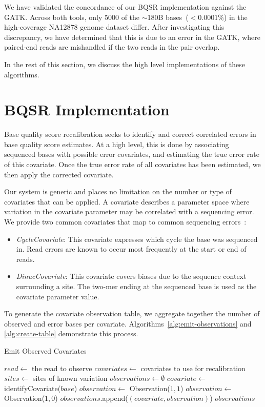 \documentclass[phd]{ucbthesis}
\begin{document}
\begin{enumerate}
We have validated the concordance of our BQSR implementation against the GATK. Across both tools, only 5000
of the $\sim$180B bases~($<0.0001\%$) in the high-coverage NA12878 genome dataset differ. After investigating
this discrepancy, we have determined that this is due to an error in the GATK, where paired-end reads are
mishandled if the two reads in the pair overlap.
\end{enumerate}

In the rest of this section, we discuss the high level implementations of these algorithms.

\section{BQSR Implementation}
\label{sec:bqsr-implementation}

Base quality score recalibration seeks to identify and correct correlated errors in base quality score estimates.
At a high level, this is done by associating sequenced bases with possible error covariates, and estimating the
true error rate of this covariate. Once the true error rate of all covariates has been estimated, we then apply
the corrected covariate.

Our system is generic and places no limitation on the number or type of covariates that can be applied. A covariate
describes a parameter space where variation in the covariate parameter may be correlated with a sequencing
error. We provide two common covariates that map to common sequencing errors~\cite{nakamura11}:

\begin{itemize}
\item \emph{CycleCovariate}: This covariate expresses which cycle the base was sequenced in. Read errors are
known to occur most frequently at the start or end of reads.
\item \emph{DinucCovariate}: This covariate covers biases due to the sequence context surrounding a site. The two-mer
ending at the sequenced base is used as the covariate parameter value.
\end{itemize}

To generate the covariate observation table, we aggregate together the number of observed and error bases per
covariate. Algorithms~\ref{alg:emit-observations} and \ref{alg:create-table} demonstrate this process.

\begin{algorithm}
\caption{Emit Observed Covariates}
\label{alg:emit-observations}
\begin{algorithmic}
\STATE $read \leftarrow$ the read to observe
\STATE $covariates \leftarrow$ covariates to use for recalibration
\STATE $sites \leftarrow$ sites of known variation
\STATE $observations \leftarrow \emptyset$
\STATE $covariate \leftarrow$ identifyCovariate($base$)
\STATE $observation \leftarrow$ Observation($1, 1$)
\ELSE
\STATE $observation \leftarrow$ Observation($1, 0$)
\ENDIF
\STATE $observations$.append($(covariate, observation)$)
\ENDFOR
\RETURN $observations$
\end{algorithmic}
\end{algorithm}
\end{document}
